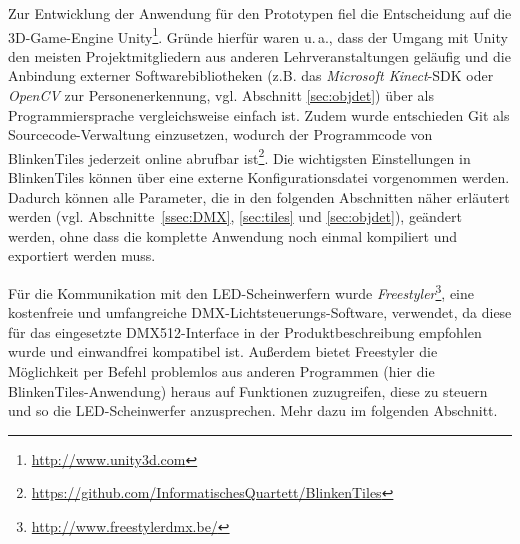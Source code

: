 \label{ssec:entscheidungen}

Zur Entwicklung der Anwendung für den Prototypen fiel die Entscheidung auf die 3D-Game-Engine Unity\footnote{\url{http://www.unity3d.com}}. Gründe hierfür waren u.\,a., dass der Umgang mit Unity den meisten Projektmitgliedern aus anderen Lehrveranstaltungen geläufig und die Anbindung externer Softwarebibliotheken (z.B. das \emph{Microsoft Kinect}-SDK oder \emph{OpenCV} zur Personenerkennung, vgl. Abschnitt \ref{sec:objdet}) über \CS{} als Programmiersprache vergleichsweise einfach ist. Zudem wurde entschieden Git als Sourcecode-Verwaltung einzusetzen, wodurch der Programmcode von BlinkenTiles jederzeit online abrufbar ist\footnote{\url{https://github.com/InformatischesQuartett/BlinkenTiles}}. Die wichtigsten Einstellungen in BlinkenTiles können über eine externe Konfigurationsdatei vorgenommen werden. Dadurch können alle Parameter, die in den folgenden Abschnitten näher erläutert werden (vgl. Abschnitte~\ref{ssec:DMX}, \ref{sec:tiles} und \ref{sec:objdet}), geändert werden, ohne dass die komplette Anwendung noch einmal kompiliert und exportiert werden muss.

Für die Kommunikation mit den LED-Scheinwerfern wurde \emph{Freestyler}\footnote{\url{http://www.freestylerdmx.be/}}, eine kostenfreie und umfangreiche DMX-Lichtsteuerungs-Software, verwendet, da diese für das eingesetzte DMX512-Interface in der Produktbeschreibung empfohlen wurde und einwandfrei kompatibel ist. Außerdem bietet Freestyler die Möglichkeit per Befehl problemlos aus anderen Programmen (hier die BlinkenTiles-Anwendung) heraus auf Funktionen zuzugreifen, diese zu steuern und so die LED-Scheinwerfer anzusprechen. Mehr dazu im folgenden Abschnitt.

